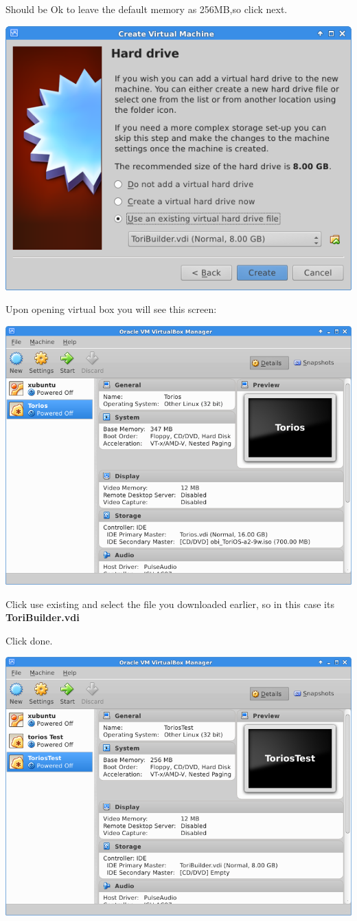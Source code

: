 \documentclass[12pt,a4paper]{book}
\begin{document}
Should be Ok to leave the default memory as 256MB,so click next.

\begin{center}
\includegraphics[width=0.7\linewidth]{ToriosTest03}
\end{center}

Upon opening virtual box you will see this screen:
\begin{center}
\includegraphics[width=0.7\linewidth]{virtualbox}
\end{center}

Click use existing and select the file you downloaded earlier, so in this case its \textbf{ToriBuilder.vdi}

Click done.

\begin{center}
\includegraphics[width=0.7\linewidth]{ToriosTest-done}
\end{center}
\end{document}
